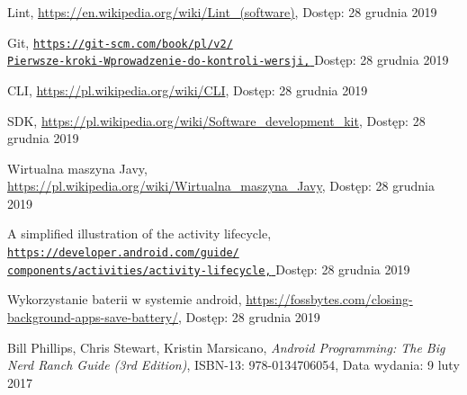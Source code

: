 \documentclass[a4paper,12pt, twoside]{article}
\begin{document}
\begin{thebibliography}{}
    		Lint,
    		\newline\url{https://en.wikipedia.org/wiki/Lint_(software)}, 
    		\newline Dostęp: 28 grudnia 2019
    		
    		\newpage
    		Git,
    		\newline\href{https://git-scm.com/book/pl/v2/Pierwsze-kroki-Wprowadzenie-do-kontroli-wersji}
    		 {\nolinkurl{https://git-scm.com/book/pl/v2/}
                 \\
                  \nolinkurl{Pierwsze-kroki-Wprowadzenie-do-kontroli-wersji,}
                 }
    		\newline Dostęp: 28 grudnia 2019
    
    		CLI,
    		\newline\url{https://pl.wikipedia.org/wiki/CLI}, 
    		\newline Dostęp: 28 grudnia 2019
    		
    		SDK,
    		\newline\url{https://pl.wikipedia.org/wiki/Software_development_kit}, 
    		\newline Dostęp: 28 grudnia 2019
    		
    		Wirtualna maszyna Javy,
    		\newline\url{https://pl.wikipedia.org/wiki/Wirtualna_maszyna_Javy}, 
    		\newline Dostęp: 28 grudnia 2019
    		
    		A simplified illustration of the activity lifecycle,
    		\newline\href{https://developer.android.com/guide/components/activities/activity-lifecycle}
    		 {\nolinkurl{https://developer.android.com/guide/}
                 \\
                  \nolinkurl{components/activities/activity-lifecycle,}
                 }
    		\newline Dostęp: 28 grudnia 2019
    		
    		Wykorzystanie baterii w systemie android,
    		\newline\url{https://fossbytes.com/closing-background-apps-save-battery/}, 
    		\newline Dostęp: 28 grudnia 2019
    		
    	    Bill Phillips, Chris Stewart, Kristin Marsicano, \textit{Android Programming: The Big Nerd Ranch Guide (3rd Edition)}, ISBN-13: 978-0134706054,
    		\newline Data wydania: 9 luty 2017
    		

\end{thebibliography}
\end{document}
